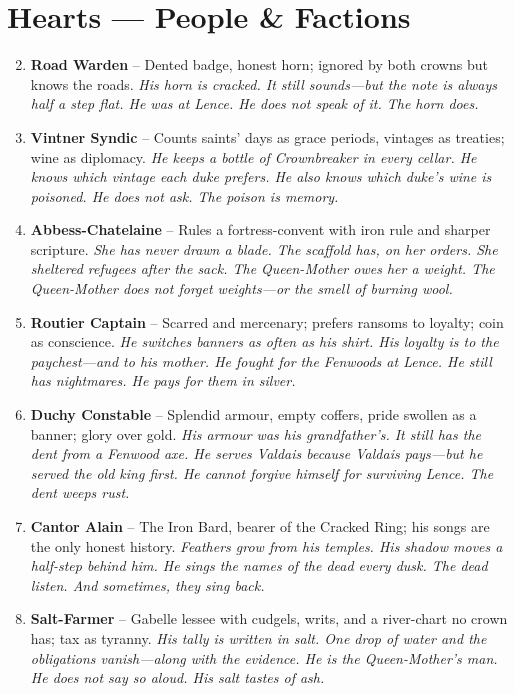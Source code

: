\section*{Hearts --- People \& Factions}
\label{sec:vhasia-people}
\begin{enumerate}
\setcounter{enumi}{1}
\item \textbf{Road Warden} -- Dented badge, honest horn; ignored by both crowns but knows the roads.
  \hfill \textit{His horn is cracked. It still sounds---but the note is always half a step flat. He was at Lence. He does not speak of it. The horn does.}
\item \textbf{Vintner Syndic} -- Counts saints' days as grace periods, vintages as treaties; wine as diplomacy.
  \hfill \textit{He keeps a bottle of Crownbreaker in every cellar. He knows which vintage each duke prefers. He also knows which duke's wine is poisoned. He does not ask. The poison is memory.}
\item \textbf{Abbess-Chatelaine} -- Rules a fortress-convent with iron rule and sharper scripture.
  \hfill \textit{She has never drawn a blade. The scaffold has, on her orders. She sheltered refugees after the sack. The Queen-Mother owes her a weight. The Queen-Mother does not forget weights---or the smell of burning wool.}
\item \textbf{Routier Captain} -- Scarred and mercenary; prefers ransoms to loyalty; coin as conscience.
  \hfill \textit{He switches banners as often as his shirt. His loyalty is to the paychest---and to his mother. He fought for the Fenwoods at Lence. He still has nightmares. He pays for them in silver.}
\item \textbf{Duchy Constable} -- Splendid armour, empty coffers, pride swollen as a banner; glory over gold.
  \hfill \textit{His armour was his grandfather's. It still has the dent from a Fenwood axe. He serves Valdais because Valdais pays---but he served the old king first. He cannot forgive himself for surviving Lence. The dent weeps rust.}
\item \textbf{Cantor Alain} -- The Iron Bard, bearer of the Cracked Ring; his songs are the only honest history.
  \hfill \textit{Feathers grow from his temples. His shadow moves a half-step behind him. He sings the names of the dead every dusk. The dead listen. And sometimes, they sing back.}
\item \textbf{Salt-Farmer} -- Gabelle lessee with cudgels, writs, and a river-chart no crown has; tax as tyranny.
  \hfill \textit{His tally is written in salt. One drop of water and the obligations vanish---along with the evidence. He is the Queen-Mother's man. He does not say so aloud. His salt tastes of ash.}

\end{enumerate}
